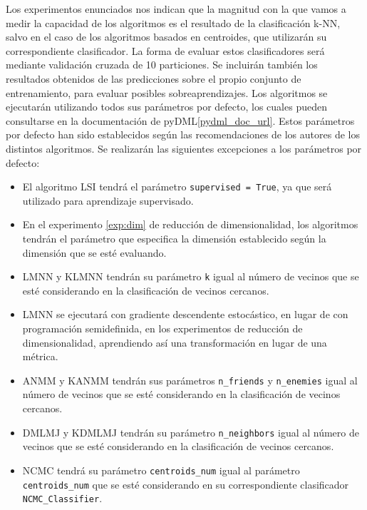 Los experimentos enunciados nos indican que la magnitud con la que vamos a medir la capacidad de los algoritmos es el resultado de la clasificación k-NN, salvo en el caso de los algoritmos basados en centroides, que utilizarán su correspondiente clasificador. La forma de evaluar estos clasificadores será mediante validación cruzada de 10 particiones. Se incluirán también los resultados obtenidos de las predicciones sobre el propio conjunto de entrenamiento, para evaluar posibles sobreaprendizajes. Los algoritmos se ejecutarán utilizando todos sus parámetros por defecto, los cuales pueden consultarse en la documentación de pyDML\cref{pydml_doc_url}. Estos parámetros por defecto han sido establecidos según las recomendaciones de los autores de los distintos algoritmos. Se realizarán las siguientes excepciones a los parámetros por defecto:
\begin{itemize}
\item El algoritmo LSI tendrá el parámetro \texttt{supervised = True}, ya que será utilizado para aprendizaje supervisado.
\item En el experimento \ref{exp:dim} de reducción de dimensionalidad, los algoritmos tendrán el parámetro que especifica la dimensión establecido según la dimensión que se esté evaluando.
\item LMNN y KLMNN tendrán su parámetro \texttt{k} igual al número de vecinos que se esté considerando en la clasificación de vecinos cercanos.
\item LMNN se ejecutará con gradiente descendente estocástico, en lugar de con programación semidefinida, en los experimentos de reducción de dimensionalidad, aprendiendo así una transformación en lugar de una métrica.
\item ANMM y KANMM tendrán sus parámetros \texttt{n\_friends} y \texttt{n\_enemies} igual al número de vecinos que se esté considerando en la clasificación de vecinos cercanos.
\item DMLMJ y KDMLMJ tendrán su parámetro \texttt{n\_neighbors} igual al número de vecinos que se esté considerando en la clasificación de vecinos cercanos.
\item NCMC tendrá su parámetro \texttt{centroids\_num} igual al parámetro \texttt{centroids\_num} que se esté considerando en su correspondiente clasificador \texttt{NCMC\_Classifier}.
\end{itemize}

